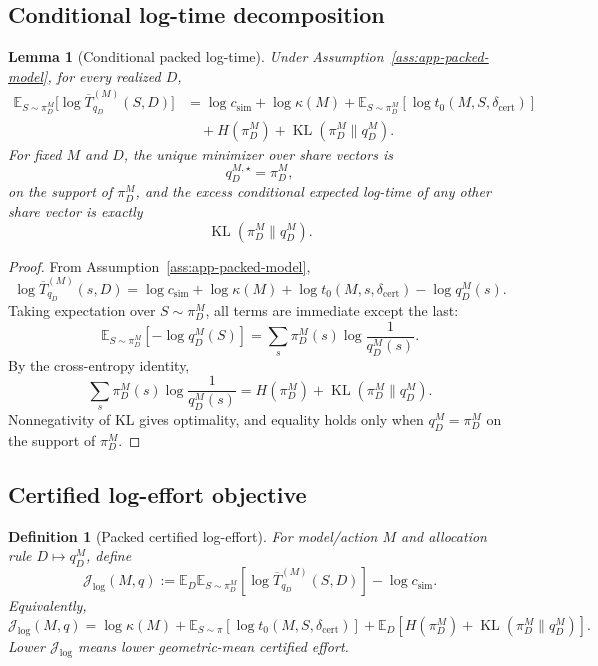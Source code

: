 \documentclass{article}
\newtheorem{definition}{Definition}
\newtheorem{lemma}{Lemma}
\DeclareMathOperator{\KL}{KL}
\newcommand{\E}{\mathbb{E}}
\newcommand{\J}{\mathcal{J}}
\begin{document}
\subsection{Conditional log-time decomposition}

\begin{lemma}[Conditional packed log-time]
\label{lem:app-conditional-packed}
Under Assumption~\ref{ass:app-packed-model}, for every realized \(D\),
\[
\begin{aligned}
    \E_{S\sim\pi_D^M}
    \bigl[
        \log \overline T^{(M)}_{q_D}(S,D)
    \bigr]
    &=
    \log c_{\mathrm{sim}}
    +
    \log\kappa(M)
    +
    \E_{S\sim\pi_D^M}
    [\log t_0(M,S,\delta_{\mathrm{cert}})]
    \\
    &\quad
    +
    H(\pi_D^M)
    +
    \KL(\pi_D^M\|q_D^M).
\end{aligned}
\]
For fixed \(M\) and \(D\), the unique minimizer over share vectors is
\[
    q_D^{M,\star}=\pi_D^M,
\]
on the support of \(\pi_D^M\), and the excess conditional expected log-time of any other
share vector is exactly
\[
    \KL(\pi_D^M\|q_D^M).
\]
\end{lemma}

\begin{proof}
From Assumption~\ref{ass:app-packed-model},
\[
    \log \overline T^{(M)}_{q_D}(s,D)
    =
    \log c_{\mathrm{sim}}
    +
    \log \kappa(M)
    +
    \log t_0(M,s,\delta_{\mathrm{cert}})
    -
    \log q_D^M(s).
\]
Taking expectation over \(S\sim\pi_D^M\), all terms are immediate except the last:
\[
    \E_{S\sim\pi_D^M}[-\log q_D^M(S)]
    =
    \sum_s \pi_D^M(s)\log\frac{1}{q_D^M(s)}.
\]
By the cross-entropy identity,
\[
    \sum_s \pi_D^M(s)\log\frac{1}{q_D^M(s)}
    =
    H(\pi_D^M)+\KL(\pi_D^M\|q_D^M).
\]
Nonnegativity of KL gives optimality, and equality holds only when
\(q_D^M=\pi_D^M\) on the support of \(\pi_D^M\).
\end{proof}

\subsection{Certified log-effort objective}

\begin{definition}[Packed certified log-effort]
\label{def:app-certified-log-effort}
For model/action \(M\) and allocation rule \(D\mapsto q_D^M\), define
\[
    \J_{\log}(M,q)
    :=
    \E_D
    \E_{S\sim\pi_D^M}
    \left[
        \log \overline T^{(M)}_{q_D}(S,D)
    \right]
    -
    \log c_{\mathrm{sim}}.
\]
Equivalently,
\[
\boxed{
    \J_{\log}(M,q)
    =
    \log\kappa(M)
    +
    \E_{S\sim\pi}
    [\log t_0(M,S,\delta_{\mathrm{cert}})]
    +
    \E_D
    \left[
        H(\pi_D^M)+\KL(\pi_D^M\|q_D^M)
    \right].
}
\]
Lower \(\J_{\log}\) means lower geometric-mean certified effort.
\end{definition}
\end{document}
